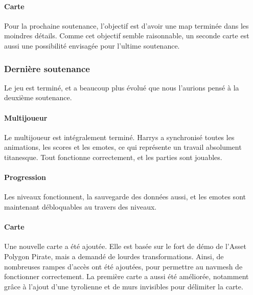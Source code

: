         \paragraph{Carte}

            Pour la prochaine soutenance, l'objectif est d'avoir une map terminée dans les moindres 
            détails. Comme cet objectif semble raisonnable, un seconde carte est aussi une possibilité 
            envisagée pour l'ultime soutenance.

    
    \vspace{0.5cm}
    \subsubsection{Dernière soutenance}
    \vspace{0.5cm}

        Le jeu est terminé, et a beaucoup plus évolué que nous l'aurions pensé à la deuxième soutenance.

        \paragraph{Multijoueur}

            Le multijoueur est intégralement terminé. Harrys a synchronisé toutes les animations, les scores et les emotes, ce qui représente 
            un travail absolument titanesque. Tout fonctionne correctement, et les parties sont jouables.

        
        \paragraph{Progression}

            Les niveaux fonctionnent, la sauvegarde des données aussi, et les emotes sont maintenant débloquables au travers des niveaux. 
        
        \paragraph{Carte}

            Une nouvelle carte a été ajoutée. Elle est basée sur le fort de démo de l'Asset Polygon Pirate, mais a demandé de lourdes transformations. 
            Ainsi, de nombreuses rampes d'accès ont été ajoutées, pour permettre au navmesh de fonctionner correctement. La première carte a aussi été améliorée, 
            notamment grâce à l'ajout d'une tyrolienne et de murs invisibles pour délimiter la carte.

